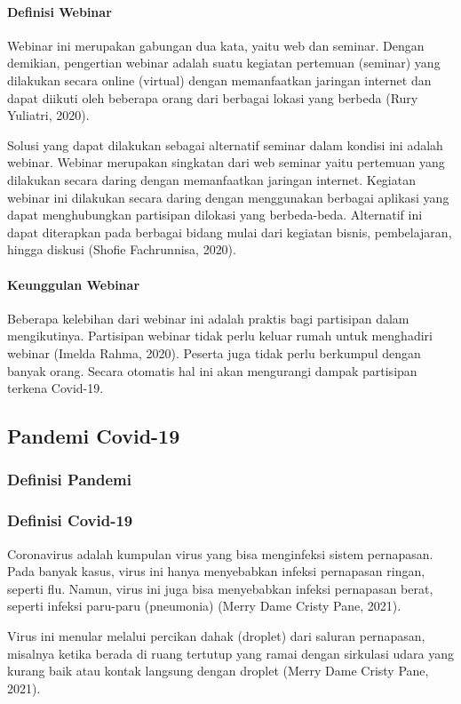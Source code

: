 \paragraph{Definisi Webinar}
Webinar ini merupakan gabungan dua kata, yaitu web dan seminar. Dengan demikian, pengertian webinar adalah suatu kegiatan pertemuan (seminar) yang dilakukan secara online (virtual) dengan memanfaatkan jaringan internet dan dapat diikuti oleh beberapa orang dari berbagai lokasi yang berbeda (Rury Yuliatri, 2020).

Solusi yang dapat dilakukan sebagai alternatif seminar dalam kondisi ini adalah webinar. Webinar merupakan singkatan dari web seminar yaitu pertemuan yang dilakukan secara daring dengan memanfaatkan jaringan internet. Kegiatan webinar ini dilakukan secara daring dengan menggunakan berbagai aplikasi yang dapat menghubungkan partisipan dilokasi yang berbeda-beda. Alternatif ini dapat diterapkan pada berbagai bidang mulai dari kegiatan bisnis, pembelajaran, hingga diskusi (Shofie Fachrunnisa, 2020).

\paragraph{Keunggulan Webinar}
Beberapa kelebihan dari webinar ini adalah praktis bagi partisipan dalam mengikutinya. Partisipan webinar tidak perlu keluar rumah untuk menghadiri webinar (Imelda Rahma, 2020). Peserta juga tidak perlu berkumpul dengan banyak orang. Secara otomatis hal ini akan mengurangi dampak partisipan terkena Covid-19.

\subsection{Pandemi Covid-19}
\subsubsection{Definisi Pandemi}
\subsubsection{Definisi Covid-19}
Coronavirus adalah kumpulan virus yang bisa menginfeksi sistem pernapasan. Pada banyak kasus, virus ini hanya menyebabkan infeksi pernapasan ringan, seperti flu. Namun, virus ini juga bisa menyebabkan infeksi pernapasan berat, seperti infeksi paru-paru (pneumonia) (Merry Dame Cristy Pane, 2021).

Virus ini menular melalui percikan dahak (droplet) dari saluran pernapasan, misalnya ketika berada di ruang tertutup yang ramai dengan sirkulasi udara yang kurang baik atau kontak langsung dengan droplet (Merry Dame Cristy Pane, 2021).

